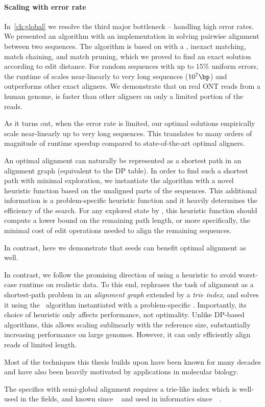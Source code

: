 \paragraph{Scaling with error rate}
In~\cref{ch:global} we resolve the third major bottleneck -- handling high error
rates. We presented an algorithm with an implementation in \astarpa solving
pairwise alignment between two sequences. The algorithm is based on \A with a
\sh, inexact matching, match chaining, and match pruning, which we proved to
find an exact solution according to edit distance. For random sequences with up
to $15\%$ uniform errors, the runtime of \astarpa scales near-linearly to very
long sequences ($10^7\bp$) and outperforms other exact aligners. We demonstrate
that on real ONT reads from a human genome, \astarpa is faster than other
aligners on only a limited portion of the reads.

As it turns out, when the error rate is limited, our optimal solutions
empirically scale near-linearly up to very long sequences. This translates to
many orders of magnitude of runtime speedup compared to state-of-the-art optimal
aligners.

An optimal alignment can naturally be represented as a shortest path in an
alignment graph (equivalent to the DP table). In order to find such a shortest
path with minimal exploration, we instantiate the \A algorithm with a novel
heuristic function based on the unaligned parts of the sequences. This
additional information is a problem-specific heuristic function and it heavily
determines the efficiency of the search. For any explored state by \A, this
heuristic function should compute a lower bound on the remaining path length, or
more specifically, the minimal cost of edit operations needed to align the
remaining sequences.

In contrast, here we demonstrate that seeds can benefit optimal alignment as
well.

In contrast, we follow the promising direction of using a heuristic to avoid
worst-case runtime on realistic data. To this end, \astarix rephrases the task
of alignment as a shortest-path problem in an \emph{alignment graph} extended by
a \emph{trie index}, and solves it using the \A~algorithm instantiated with a
problem-specific \prefixh. Importantly, its choice of heuristic only affects
performance, not optimality.
%
Unlike DP-based algorithms, this \prefixh allows scaling sublinearly with the
reference size, substantially increasing performance on large genomes. However,
it can only efficiently align reads of limited length.

Most of the techniques this thesis builds upon have been known for many decades
and have also been heavily motivated by applications in molecular biology. 

The specifics with semi-global alignment requires a trie-like index which is
well-used in the fields, and known since
\citeyear{thue1912gegenseitige}~\cite{thue1912gegenseitige} and used in
informatics since~\citeyear{de1959file}~\cite{de1959file}.
